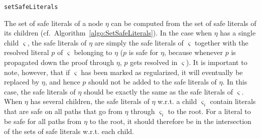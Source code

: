\documentclass[envcountsame]{llncs}
\begin{document}
\linesnumbered
\begin{algorithm}[!b]
\begin{footnotesize}
\SetLine
{}


\BlankLine

\caption{\label{algo:SetSafeLiterals} \texttt{setSafeLiterals}}
\end{footnotesize}
\end{algorithm}


The set of safe literals of a node $\eta$ can be computed from the set of safe
literals of its children (cf.\ Algorithm~\ref{algo:SetSafeLiterals}). In the case when $\eta$ has a single child $\varsigma$, the safe literals of $\eta$ are simply the safe literals of $\varsigma$ together with the resolved literal $p$ of $\varsigma$ belonging to $\eta$ ($p$ is safe for $\eta$, because whenever $p$ is propagated down the proof through $\eta$, $p$ gets resolved in $\varsigma$). It is important to note, however, that if $\varsigma$ has been marked as regularized, it will eventually be replaced by $\eta$, and hence $p$ should not be added to the safe literals of $\eta$. In this case, the safe literals of $\eta$ should be exactly the same as the safe literals of $\varsigma$. When $\eta$ has several children, the safe literals of $\eta$ w.r.t. a child $\varsigma_i$ contain literals that are safe on all paths that go from $\eta$ through $\varsigma_i$ to the root. For a literal to be safe for all paths from $\eta$ to the root, it should therefore be in the intersection of the sets of safe literals w.r.t. each child.
\end{document}
